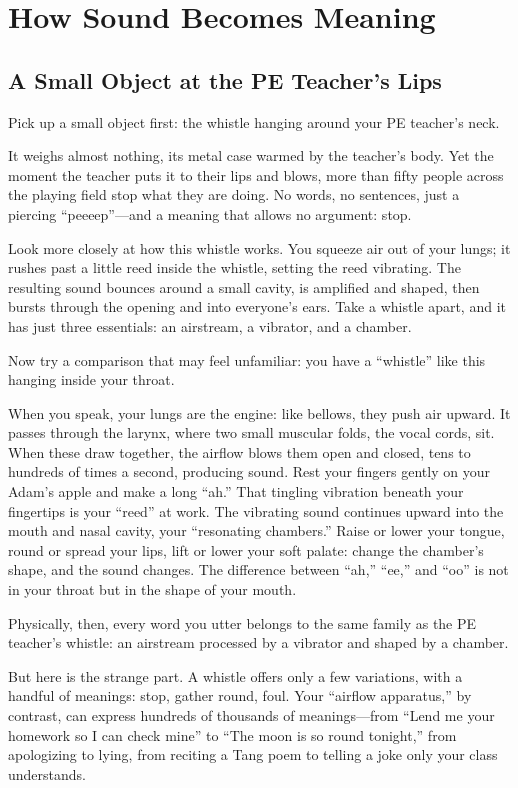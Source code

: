 \chapter{How Sound Becomes Meaning}
\section{A Small Object at the PE Teacher's Lips}
Pick up a small object first: the whistle hanging around your PE teacher's neck.

It weighs almost nothing, its metal case warmed by the teacher's body. Yet the moment the teacher puts it to their lips and blows, more than fifty people across the playing field stop what they are doing. No words, no sentences, just a piercing ``peeeep''---and a meaning that allows no argument: stop.

Look more closely at how this whistle works. You squeeze air out of your lungs; it rushes past a little reed inside the whistle, setting the reed vibrating. The resulting sound bounces around a small cavity, is amplified and shaped, then bursts through the opening and into everyone's ears. Take a whistle apart, and it has just three essentials: an airstream, a vibrator, and a chamber.

Now try a comparison that may feel unfamiliar: you have a ``whistle'' like this hanging inside your throat.

When you speak, your lungs are the engine: like bellows, they push air upward. It passes through the larynx, where two small muscular folds, the vocal cords, sit. When these draw together, the airflow blows them open and closed, tens to hundreds of times a second, producing sound. Rest your fingers gently on your Adam's apple and make a long ``ah.'' That tingling vibration beneath your fingertips is your ``reed'' at work. The vibrating sound continues upward into the mouth and nasal cavity, your ``resonating chambers.'' Raise or lower your tongue, round or spread your lips, lift or lower your soft palate: change the chamber's shape, and the sound changes. The difference between ``ah,'' ``ee,'' and ``oo'' is not in your throat but in the shape of your mouth.

Physically, then, every word you utter belongs to the same family as the PE teacher's whistle: an airstream processed by a vibrator and shaped by a chamber.

But here is the strange part. A whistle offers only a few variations, with a handful of meanings: stop, gather round, foul. Your ``airflow apparatus,'' by contrast, can express hundreds of thousands of meanings---from ``Lend me your homework so I can check mine'' to ``The moon is so round tonight,'' from apologizing to lying, from reciting a Tang poem to telling a joke only your class understands.

